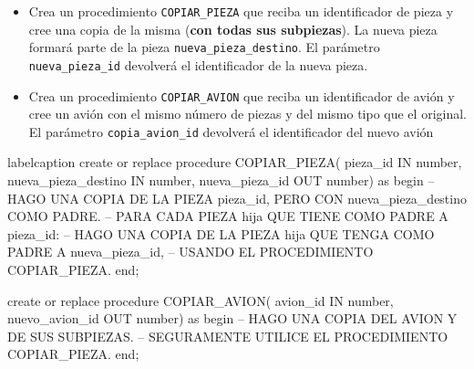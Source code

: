 \needspace{.15\textheight}
\begin{homeworkProblem}
  \begin{itemize}
  \item Crea un procedimiento \texttt{COPIAR\_PIEZA}
    que reciba un identificador de pieza y cree una copia de la misma (\textbf{con todas sus subpiezas}). La nueva pieza
    formará parte de la pieza \texttt{nueva\_pieza\_destino}. El parámetro \texttt{nueva\_pieza\_id} devolverá el
    identificador de la nueva pieza.

   
  \item Crea un procedimiento \texttt{COPIAR\_AVION} que reciba un identificador de avión y cree un avión con el mismo número de piezas y del mismo tipo que
    el original. El parámetro \texttt{copia\_avion\_id} devolverá el identificador del nuevo avión
  \end{itemize}

\begin{listadosql}{label}{caption}
create or replace procedure COPIAR_PIEZA(
  pieza_id IN number, 
  nueva_pieza_destino IN number, 
  nueva_pieza_id OUT number) 
as
begin
  -- HAGO UNA COPIA DE LA PIEZA pieza_id, PERO CON nueva_pieza_destino COMO PADRE.
  -- PARA CADA PIEZA hija QUE TIENE COMO PADRE A pieza_id:
  --   HAGO UNA COPIA DE LA PIEZA hija QUE TENGA COMO PADRE A nueva_pieza_id,
  --   USANDO EL PROCEDIMIENTO COPIAR_PIEZA.
end; 

create or replace procedure COPIAR_AVION(
  avion_id IN number, 
  nuevo_avion_id OUT number) 
as
begin
  -- HAGO UNA COPIA DEL AVION Y DE SUS SUBPIEZAS.
  -- SEGURAMENTE UTILICE EL PROCEDIMIENTO COPIAR_PIEZA.
end;
\end{listadosql}

\end{homeworkProblem}

